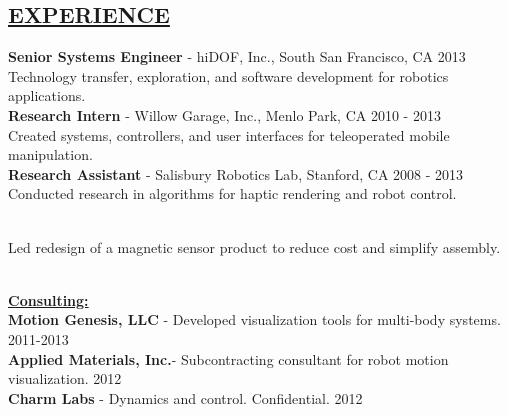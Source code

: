 \documentclass[line,margin]{res}
\newcommand{\CVOnly}[1]{}
\newcommand{\CVOnly}[1]{#1}
\newcommand{\hide}[1]{}
\begin{document}
\begin{resume}
\section{\underline{EXPERIENCE}} 
\vspace{1.0pc}
{\bf Senior Systems Engineer} -  hiDOF, Inc., South San Francisco, CA  \hfill 2013
\\[0.0pc]Technology transfer, exploration, and software development for robotics applications.
%
\\[0.4pc]{\bf Research Intern} - Willow Garage, Inc., Menlo Park, CA \hfill 2010 - 2013
\\[0.0pc]Created systems, controllers, and user interfaces for teleoperated mobile manipulation.
%
\\[0.4pc]{\bf Research Assistant} - Salisbury Robotics Lab, Stanford, CA \hfill 2008 - 2013
\\[0.0pc]Conducted research in algorithms for haptic rendering and robot control.
\CVOnly{\\[0.0pc]Implemented miniature stereo camera sensor hardware for a robot gripper.}
%
\CVOnly{
\\[0.4pc]{\bf Electrical Engineering Intern} - Qual-Tron, Inc., Tulsa, OK \hfill 2006 - 2007 }
\CVOnly{\\[0.0pc] Designed and implemented test procedures for IR and magnetic sensor products. }
\\[0.0pc]Led redesign of a magnetic sensor product to reduce cost and simplify assembly.
%
\hide{
\\[0.4pc]{\bf Summer Intern} - Atmel Corporation \hfill 2005
\\[0.4pc]{\bf Summer Research Intern} - NASA Glenn Research Center \hfill 2004%
}
%
\\[0.4pc]{\bf \underline{Consulting:}}
\\[0.2pc]{\bf Motion Genesis, LLC} - Developed visualization tools for multi-body systems. \hfill 2011-2013
\\[0.0pc]{\bf Applied Materials, Inc.}- Subcontracting consultant for robot motion visualization. \hfill 2012
\\[0.0pc]{\bf Charm Labs} - Dynamics and control. Confidential. \hfill 2012
%

%
%

\end{resume}
\end{document}
